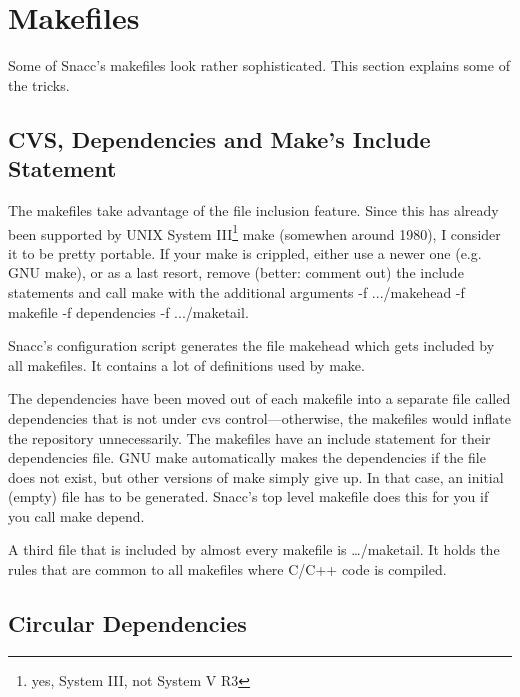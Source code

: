 
%

\chapter{\label{makefile-sect}Makefiles}

Some of Snacc's makefiles look rather sophisticated.
This section explains some of the tricks.

\section{CVS, Dependencies and Make's Include Statement}

The makefiles take advantage of the file inclusion feature.
Since this has already been supported by UNIX System III\footnote{yes, System III, not System V R3} make (somewhen around 1980), I consider it to be pretty portable.
If your make is crippled, either use a newer one (e.g. GNU make), or as a last resort, remove (better: comment out) the include statements and call make with the additional arguments {\ufn -f .../makehead -f makefile -f dependencies -f .../maketail}.

Snacc's configuration script generates the file {\ufn makehead} which gets included by all makefiles.
It contains a lot of definitions used by make.

The dependencies have been moved out of each makefile into a separate file called {\ufn dependencies} that is not under cvs control---otherwise, the makefiles would inflate the repository unnecessarily.
The makefiles have an include statement for their dependencies file.
GNU make automatically makes the dependencies if the file does not exist, but other versions of {\ufn make} simply give up.
In that case, an initial (empty) file has to be generated.
Snacc's top level makefile does this for you if you call {\ufn make depend}.

A third file that is included by almost every makefile is {\ufn \dots/maketail}.
It holds the rules that are common to all makefiles where C/C++ code is compiled.

\section{Circular Dependencies}

